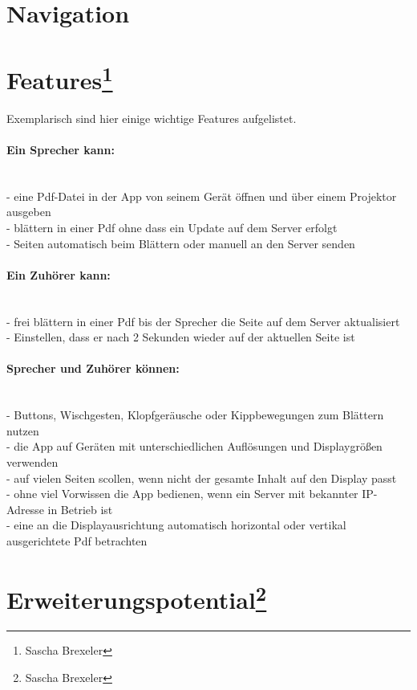 \newpage

\section{Navigation}




\section[Features]{Features\footnote{Sascha Brexeler}}

Exemplarisch sind hier einige wichtige Features aufgelistet.

\paragraph{Ein Sprecher kann:}$\;$\\
- eine Pdf-Datei in der App von seinem Gerät öffnen und über einem Projektor ausgeben\\
- blättern in einer Pdf ohne dass ein Update auf dem Server erfolgt\\
- Seiten automatisch beim Blättern oder manuell an den Server senden
\paragraph{Ein Zuhörer kann:}$\;$\\
- frei blättern in einer Pdf bis der Sprecher die Seite auf dem Server aktualisiert\\
- Einstellen, dass er nach 2 Sekunden wieder auf der aktuellen Seite ist
\paragraph{Sprecher und Zuhörer können:}$\;$\\
- Buttons, Wischgesten, Klopfgeräusche oder Kippbewegungen zum Blättern nutzen\\
- die App auf Geräten mit unterschiedlichen Auflösungen und Displaygrößen verwenden\\
- auf vielen Seiten scollen, wenn nicht der gesamte Inhalt auf den Display passt\\
- ohne viel Vorwissen die App bedienen, wenn ein Server mit bekannter IP-Adresse in Betrieb ist\\
- eine an die Displayausrichtung automatisch horizontal oder vertikal ausgerichtete Pdf betrachten
\section[Erweiterungspotential]{Erweiterungspotential\footnote{Sascha Brexeler}}

